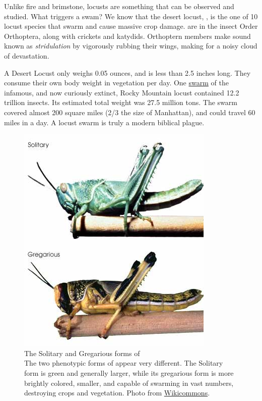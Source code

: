   Unlike fire and brimstone, locusts are something that can be observed and studied. What triggers a swam? We know that the desert locust, \locusts{}, is the one of 10 locust species that swarm and cause massive crop damage. \locusts{} are in the insect Order Orthoptera, along with crickets and katydids. Orthoptern members make sound known as \textit{stridulation} by vigorously rubbing their wings, making for a noisy cloud of devastation.

  A Desert Locust only weighs 0.05 ounces, and is less than 2.5 inches long. They consume their own body weight in vegetation per day. One \href{http://animaldiversity.ummz.umich.edu/site/accounts/information/Melanoplus_spretus.html}{swarm} of the infamous, and now curiously extinct, Rocky Mountain locust contained 12.2 trillion insects. Its estimated total weight was 27.5 million tons. The swarm covered almost 200 square miles (2/3 the size of Manhattan), and could travel 60 miles in a day. A locust swarm is truly a modern biblical plague.

  \begin{figure}[htbp] %
    \centering 
    \includegraphics{Figures/Intro/DesertLocust.jpeg}
    \caption[The Solitary and Gregarious forms of \locusts{}]
    {
      The Solitary and Gregarious forms of \locusts{}\\[0.25cm]
      The two phenotypic forms of \locusts{} appear very different. The Solitary form is green and generally larger, while its gregarious form is more brightly colored, smaller, and capable of swarming in vast numbers, destroying crops and vegetation. Photo from \href{http://www.wikicommons.com}{Wikicommons}.
      }
    \label{fig:Locust}
    \end{figure}

